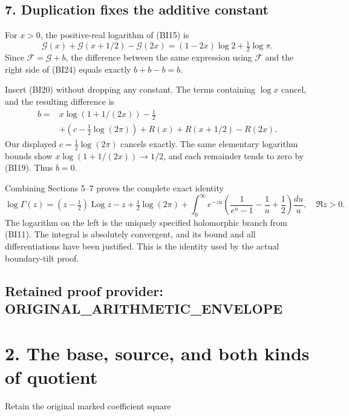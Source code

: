 \documentclass[11pt,a4paper]{article}
\begin{document}
\subsection{7. Duplication fixes the additive constant}\label{duplication-fixes-the-additive-constant}

For \(x>0\), the positive-real logarithm of (BI15) is \[
\mathcal G(x)+\mathcal G(x+1/2)-\mathcal G(2x)
=(1-2x)\log2+\tfrac12\log\pi.
\tag{BI24}
\] Since \(\mathcal F=\mathcal G+b\), the difference between the same expression using \(\mathcal F\) and the right side of (BI24) equals exactly \(b+b-b=b\).

Insert (BI20) without dropping any constant. The terms containing \(\log x\) cancel, and the resulting difference is \[
\begin{split}
b={}&x\log(1+1/(2x))-\tfrac12\\
&+\left(c-\tfrac12\log(2\pi)\right)
 +R(x)+R(x+1/2)-R(2x).
\end{split}
\tag{BI25}
\] Our displayed \(c=\tfrac12\log(2\pi)\) cancels exactly. The same elementary logarithm bounds show \(x\log(1+1/(2x))\to1/2\), and each remainder tends to zero by (BI19). Thus \(b=0\).

Combining Sections 5--7 proves the complete exact identity \[
\boxed{
\log\Gamma(z)
=(z-\tfrac12)\operatorname{Log}z-z+\tfrac12\log(2\pi)
+\int_0^\infty e^{-zu}
\left(\frac1{e^u-1}-\frac1u+\frac12\right)\frac{du}{u},
\quad\Re z>0.}
\tag{BI26}
\] The logarithm on the left is the uniquely specified holomorphic branch from (BI11). The integral is absolutely convergent, and its bound and all differentiations have been justified. This is the identity used by the actual boundary-tilt proof.


\clearpage
\subsection*{Retained proof provider: ORIGINAL\_ARITHMETIC\_ENVELOPE}

\section{2. The base, source, and both kinds of
quotient}\label{the-base-source-and-both-kinds-of-quotient}

Retain the original marked coefficient square
\end{document}
